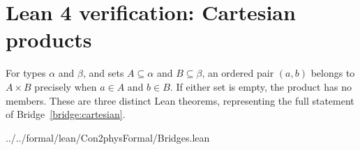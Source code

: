 \section{Lean 4 verification: Cartesian products}
\label{sec:lean-bridge-03}
For types $\alpha$ and $\beta$, and sets $A\subseteq\alpha$ and
$B\subseteq\beta$, an ordered pair $(a,b)$ belongs to $A\times B$
precisely when $a\in A$ and $b\in B$. If either set is empty,
the product has no members. These are three distinct Lean theorems,
representing the full statement of Bridge~\ref{bridge:cartesian}.


{../../formal/lean/Con2physFormal/Bridges.lean}
